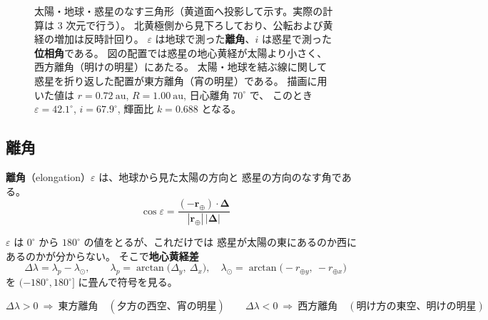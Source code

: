 \documentclass[a4paper,11pt]{ltjsarticle}
\newcommand{\vek}[1]{\boldsymbol{#1}}
\begin{document}
\begin{figure}[htbp]
\caption{太陽・地球・惑星のなす三角形（黄道面へ投影して示す。実際の計算は 3 次元で行う）。
北黄極側から見下ろしており、公転および黄経の増加は反時計回り。
$\varepsilon$ は地球で測った\textbf{離角}、$i$ は惑星で測った\textbf{位相角}である。
図の配置では惑星の地心黄経が太陽より小さく、西方離角（明けの明星）にあたる。
太陽・地球を結ぶ線に関して惑星を折り返した配置が東方離角（宵の明星）である。
描画に用いた値は $r=0.72\ \mathrm{au}$, $R=1.00\ \mathrm{au}$, 日心離角 $70^\circ$ で、
このとき $\varepsilon=42.1^\circ$, $i=67.9^\circ$, 輝面比 $k=0.688$ となる。}
\label{fig:triangle}
\end{figure}

\subsection{離角}

\textbf{離角}（elongation）$\varepsilon$ は、地球から見た太陽の方向と
惑星の方向のなす角である。
\begin{equation}
  \cos\varepsilon
  = \frac{(-\vek{r}_\oplus)\cdot\vek{\Delta}}
         {|\vek{r}_\oplus|\,|\vek{\Delta}|}
  \label{eq:elongation}
\end{equation}

$\varepsilon$ は $0^\circ$ から $180^\circ$ の値をとるが、これだけでは
惑星が太陽の東にあるのか西にあるのかが分からない。
そこで\textbf{地心黄経差}
\begin{equation}
  \Delta\lambda = \lambda_p - \lambda_\odot,\qquad
  \lambda_p = \arctan\!\big(\Delta_y,\ \Delta_x\big),\quad
  \lambda_\odot = \arctan\!\big(-r_{\oplus y},\ -r_{\oplus x}\big)
\end{equation}
を $(-180^\circ, 180^\circ]$ に畳んで符号を見る。

\begin{equation}
  \Delta\lambda > 0 \ \Longrightarrow\ \textbf{東方離角}\quad(\text{夕方の西空、宵の明星})
  \qquad
  \Delta\lambda < 0 \ \Longrightarrow\ \textbf{西方離角}\quad(\text{明け方の東空、明けの明星})
\end{equation}
\end{document}
